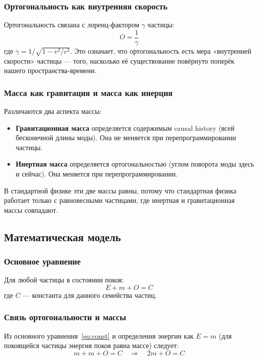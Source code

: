\documentclass[12pt,a4paper]{article}
\begin{document}
\subsubsection{Ортогональность как внутренняя скорость}
Ортогональность связана с лоренц-фактором $\gamma$ частицы:
\begin{equation}
    O = \frac{1}{\gamma}
    \label{eq:ogamma}
\end{equation}
где $\gamma = 1/\sqrt{1 - v^2/c^2}$. Это означает, что ортогональность есть мера «внутренней скорости» частицы --- того, насколько её существование повёрнуто поперёк нашего пространства-времени.

\subsubsection{Масса как гравитация и масса как инерция}
Различаются два аспекта массы:
\begin{itemize}
    \item \textbf{Гравитационная масса} определяется содержимым causal history (всей бесконечной длины моды). Она не меняется при перепрограммировании частицы.
    \item \textbf{Инертная масса} определяется ортогональностью (углом поворота моды здесь и сейчас). Она меняется при перепрограммировании.
\end{itemize}

В стандартной физике эти две массы равны, потому что стандартная физика работает только с равновесными частицами, где инертная и гравитационная массы совпадают.

\subsection{Математическая модель}

\subsubsection{Основное уравнение}
Для любой частицы в состоянии покоя:
\begin{equation}
    E + m + O = C
    \label{eq:const}
\end{equation}
где $C$ --- константа для данного семейства частиц.

\subsubsection{Связь ортогональности и массы}
Из основного уравнения~\eqref{eq:const} и определения энергии как $E = m$ (для покоящейся частицы энергия покоя равна массе) следует:
\begin{equation}
    m + m + O = C \quad \Rightarrow \quad 2m + O = C
    \label{eq:2mplusO}
\end{equation}
\end{document}
